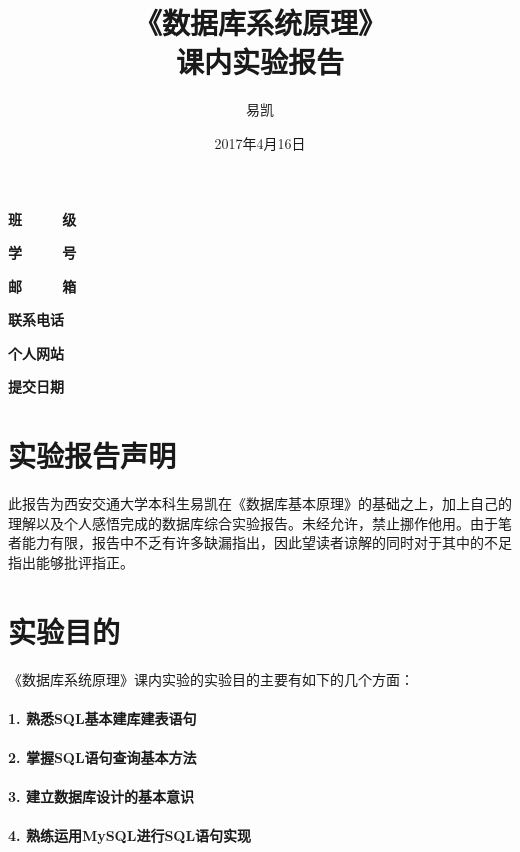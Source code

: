 \documentclass[UTF8]{ctexart}
\title{\Huge{《数据库系统原理》\\课内实验报告}}
\author{\Huge{易凯}}
\date{\Huge{2017年4月16日}}
\begin{document}
  \maketitle
  \vspace{35mm}
  \begin{flushright}
  \Large{
    \textbf{班\ \ \ \ \ 级} 

    \textbf{学\ \ \ \ \ 号} 

    \textbf{邮\ \ \ \ \ 箱} 

    \textbf{联系电话} 

    \textbf{个人网站} 

    \textbf{提交日期} \makebox[5em][l]{\today}
    }
    \end{flushright}
    \newpage
    \tableofcontents
    \newpage
    \listoffigures
    \newpage

    \section{实验报告声明}
    此报告为西安交通大学本科生易凯在《数据库基本原理》的基础之上，加上自己的理解以及个人感悟完成的数据库综合实验报告。未经允许，禁止挪作他用。由于笔者能力有限，报告中不乏有许多缺漏指出，因此望读者谅解的同时对于其中的不足指出能够批评指正。

    \section{实验目的}
    《数据库系统原理》课内实验的实验目的主要有如下的几个方面：

    \paragraph{1. 熟悉SQL基本建库建表语句}

    \paragraph{2. 掌握SQL语句查询基本方法}

    \paragraph{3. 建立数据库设计的基本意识}

    \paragraph{4. 熟练运用MySQL进行SQL语句实现}
\end{document}
